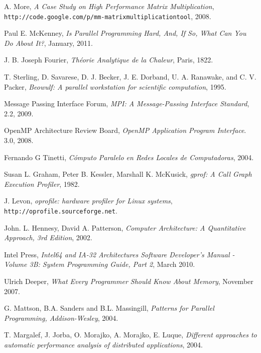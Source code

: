 \documentclass[a4paper]{report}
\begin{document}
\begin{thebibliography}{9}

  A. More,
  \emph{A Case Study on High Performance Matrix Multiplication},
  {\tt http://code.google.com/p/mm-matrixmultiplicationtool},
  2008.

  Paul E. McKenney,
  \emph{Is Parallel Programming Hard, And, If So, What Can You Do About It?},
  January, 2011.

  J. B. Joseph Fourier, \emph{Théorie Analytique de la Chaleur}, Paris, 1822.

  T. Sterling, D. Savarese, D. J. Becker, J. E. Dorband, U. A. Ranawake,
  and C. V. Packer,
  \emph{Beowulf: A parallel workstation for scientific computation},
  1995.

  Message Passing Interface Forum,
  \emph{MPI: A Message-Passing Interface Standard},
  2.2,
  2009.

  OpenMP Architecture Review Board,
  \emph{OpenMP Application Program Interface}.
  3.0,
  2008.

  Fernando G Tinetti,
  \emph{Cómputo Paralelo en Redes Locales de Computadoras},
  2004.

  Susan L. Graham,  Peter B. Kessler,  Marshall K. McKusick,
  \emph{gprof: A Call Graph Execution Profiler},
  1982.
  
  J. Levon,
  \emph{oprofile: hardware profiler for Linux systems},
       {\tt http://oprofile.sourceforge.net}.
  
  John. L. Hennesy, David A. Patterson,
  \emph{Computer Architecture: A Quantitative Approach, 3rd Edition},
  2002.

  Intel Press,
  \emph{Intel64 and IA-32 Architectures Software Developer's Manual - Volume
    3B: System Programming Guide, Part 2},
  March 2010.

  Ulrich Deeper,
  \emph{What Every Programmer Should Know About Memory},
  November 2007.

  G. Mattson, B.A. Sanders and B.L. Massingill, 
  \emph{Patterns for Parallel Programming, Addison-Wesley},
  2004.
  
  T. Margalef, J. Jorba, O. Morajko, A. Morajko, E. Luque,
  \emph{Different approaches to automatic performance analysis of distributed
    applications},
  2004.
  

\end{thebibliography}
\end{document}
